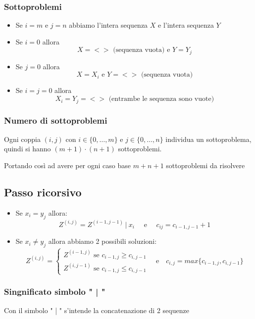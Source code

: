 \subsubsection{Sottoproblemi}
\begin{itemize}
    \item Se $i=m$ e $j=n$ abbiamo l'intera sequenza $X$ e l'intera sequenza $Y$
    \item Se $i=0$ allora 
        $$X = <> \text{ (sequenza vuota) e } Y=Y_j$$
    \item Se $j=0$ allora 
        $$X=X_i \text{ e } Y=<> \text{ (sequenza vuota)}$$
    \item Se $i=j=0$ allora 
        $$X_i = Y_j = <> \text{ (entrambe le sequenza sono vuote)}$$
\end{itemize}


\subsubsection{Numero di sottoproblemi}
Ogni coppia $(i,j)$ con $i \in \{0, \dots, m\}$ e $j \in \{0, \dots, n\}$ individua un sottoproblema, quindi si hanno $(m+1) \cdot (n+1)$ sottoproblemi.

Portando così ad avere per ogni caso base $m+n+1$ sottoproblemi da risolvere

\subsection{Passo ricorsivo}
\begin{itemize}
    \item Se $x_i = y_j$ allora:
        $$
            Z^{(i,j)} = Z^{(i-1,j-1)}\ |\ x_i \quad \text{ e } \quad c_{ij} = c_{i-1,j-1} + 1
        $$
    
    \item Se $x_i \not= y_j$ allora abbiamo 2 possibili soluzioni:
            $$
            Z^{(i,j)} = 
                \begin{cases}
                    Z^{(i-1,j)} \text{ se } c_{i-1,j} \geq c_{i,j-1} \\
                    Z^{(i,j-1)} \text{ se } c_{i-1,j} \leq c_{i,j-1} 
                \end{cases} \quad \text{e} \quad c_{i,j} = max\{c_{i-1,j}, c_{i,j-1}\}
            $$
\end{itemize}

\subsubsection{Singnificato simbolo " | "}
Con il simbolo " | " s'intende la concatenazione di 2 sequenze 

